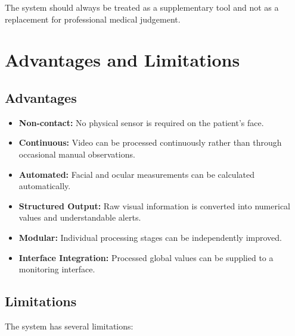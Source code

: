 \documentclass[12pt]{tietreport}
\begin{document}
The system should always be treated as a supplementary tool and not
as a replacement for professional medical judgement.


\chapter{Advantages and Limitations}

\section{Advantages}

\begin{itemize}[leftmargin=*]

    \item \textbf{Non-contact:}
    No physical sensor is required on the patient's face.

    \item \textbf{Continuous:}
    Video can be processed continuously rather than through
    occasional manual observations.

    \item \textbf{Automated:}
    Facial and ocular measurements can be calculated automatically.

    \item \textbf{Structured Output:}
    Raw visual information is converted into numerical values and
    understandable alerts.

    \item \textbf{Modular:}
    Individual processing stages can be independently improved.

    \item \textbf{Interface Integration:}
    Processed global values can be supplied to a monitoring
    interface.

\end{itemize}

\section{Limitations}

The system has several limitations:
\end{document}
